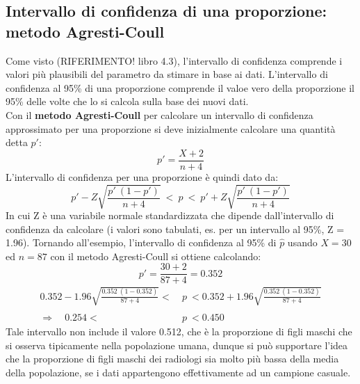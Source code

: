 \documentclass[10pt, draft]{book}
\newcounter{example}[section]
\begin{document}
\begin{example}
    \subsection{Intervallo di confidenza di una proporzione: metodo Agresti-Coull}
    Come visto (RIFERIMENTO! libro 4.3), l'intervallo di confidenza comprende i valori più plausibili del parametro da stimare in base ai dati. L'intervallo di confidenza al 95\% di una proporzione comprende il valoe vero della proporzione il 95\% delle volte che lo si calcola sulla base dei nuovi dati.
    \\
    Con il \textbf{metodo Agresti-Coull} per calcolare un intervallo di confidenza approssimato per una proporzione si deve inizialmente calcolare una quantità detta $p'$:
    \begin{equation}
    p' = \frac{X+2}{n+4}
    \end{equation}
    L'intervallo di confidenza per una proporzione è quindi dato da:
    \begin{equation}
    p' - Z\sqrt{\frac{p' \ (1-p')}{n+4}} \ < \ p \ < \ p' + Z\sqrt{\frac{p' \ (1-p')}{n+4}}
    \end{equation}
    In cui Z è una variabile normale standardizzata che dipende dall'intervallo di confidenza da calcolare (i valori sono tabulati, es. per un intervallo al 95\%, Z = 1.96).
    Tornando all'esempio, l'intervallo di confidenza al 95\% di $\hat{p}$ usando $X = 30$ ed $n = 87$ con il metodo Agresti-Coull si ottiene calcolando:
    \begin{equation}
    p' = \frac{30+2}{87+4} = 0.352
    \end{equation}
    \begin{align*}
    0.352 - 1.96\sqrt{\frac{0.352 \ (1-0.352)}{87+4}} < \ &p \ < 0.352 + 1.96\sqrt{\frac{0.352 \ (1-0.352)}{87+4}}
    \\ \\
    \Rightarrow \quad 0.254 < \ &p \ <0.450
    \end{align*}
    Tale intervallo non include il valore 0.512, che è la proporzione di figli maschi che si osserva tipicamente nella popolazione umana, dunque si può supportare l'idea che la proporzione di figli maschi dei radiologi sia molto più bassa della media della popolazione, se i dati appartengono effettivamente ad un campione casuale.


\end{example}
\end{document}
